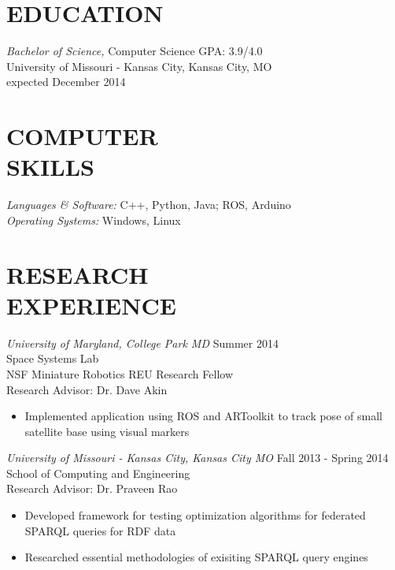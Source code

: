 \documentclass[line,margin]{res}
\begin{document}
\address{\hfill (913) 235-1070 \textbar \textbar \hspace{1 mm}  victoria.chen.wu@gmail.com \textbar \textbar \hspace{1 mm} vptarmigan.wordpress.com} 

 
\begin{resume}
 
\section{EDUCATION} {\sl Bachelor of Science,} Computer Science	\hfill GPA: 3.9/4.0\\
                University of Missouri - Kansas City, Kansas City, MO \\
                expected December 2014 
\section{COMPUTER \\ SKILLS} {\sl Languages \& Software:} 
		C++, Python, Java; ROS, Arduino \\
                {\sl Operating Systems:} Windows, Linux 
\section {RESEARCH \\ EXPERIENCE}
		{\sl University of Maryland, College Park MD}  \hfill  Summer 2014\\
		Space Systems Lab\\
		NSF Miniature Robotics REU Research Fellow \\
		Research Advisor: Dr. Dave Akin 
                 \begin{itemize}[leftmargin=5mm]  \itemsep -2pt %
		 \item Implemented application using ROS and ARToolkit to track pose of small satellite base using visual markers
         \end{itemize} 
		
		
		{\sl University of Missouri - Kansas City, Kansas City MO} \hfill Fall 2013 - Spring 2014\\
		School of Computing and Engineering \\
		Research Advisor: Dr. Praveen Rao
		 \begin{itemize} [leftmargin=5mm]  \itemsep -2pt %
		 \item  Developed framework for testing optimization algorithms for federated SPARQL queries for RDF data
		\item   Researched essential methodologies of exisiting SPARQL query engines 
		\end{itemize}



\end{resume}
\end{document}

